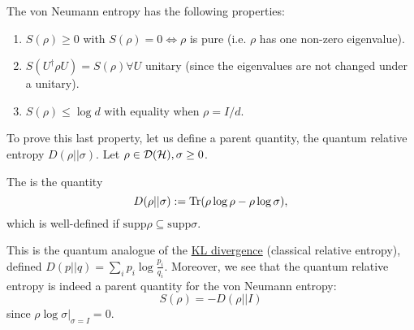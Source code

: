 The von Neumann entropy has the following properties:
\begin{enumerate}
    \item $S(\rho) \geq 0 $ with $S(\rho)=0 \iff \rho$ is pure (i.e. $\rho$ has one non-zero eigenvalue).
    \item $S(U^\dagger \rho U)=S(\rho) \forall U$ unitary (since the eigenvalues are not changed under a unitary).
    \item $S(\rho) \leq \log d$ with equality when $\rho=I/d$.
\end{enumerate}
To prove this last property, let us define a parent quantity, the quantum relative entropy $D(\rho||\sigma).$ Let $\rho\in \mathcal{D}(\mathcal H), \sigma \geq 0$. 
\begin{defn}
    The  is the quantity
    \begin{equation}
        D(\rho||\sigma) := \operatorname{Tr}(\rho \log \rho - \rho \log \sigma),
    \end{equation}
    which is well-defined if $\text{supp}\rho \subseteq \text{supp}\sigma$.
\end{defn}
This is the quantum analogue of the \href{https://en.wikipedia.org/wiki/Kullback\%E2\%80\%93Leibler_divergence}{KL divergence}
(classical relative entropy), defined $D(p||q)=\sum_i p_i \log \frac{p_i}{q_i}$.
Moreover, we see that the quantum relative entropy is indeed a parent quantity for the von Neumann entropy:
\begin{equation}
    S(\rho)=-D(\rho||I)
\end{equation}
since $\rho\log \sigma|_{\sigma=I}=0$.

